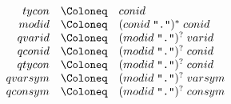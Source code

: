 \begin{align*}
  \begin{array}{rcl}
    {tycon}
    & \Coloneq & {conid}
    \\
    {modid}
    & \Coloneq & ({conid}\; \text{\texttt{\textquotedbl .\textquotedbl}})^*\; {conid}
    \\
    {qvarid}
    & \Coloneq & ({modid}\; \text{\texttt{\textquotedbl .\textquotedbl}})^?\; {varid}
    \\
    {qconid}
    & \Coloneq & ({modid}\; \text{\texttt{\textquotedbl .\textquotedbl}})^?\; {conid}
    \\
    {qtycon}
    & \Coloneq & ({modid}\; \text{\texttt{\textquotedbl .\textquotedbl}})^?\; {conid}
    \\
    {qvarsym}
    & \Coloneq & ({modid}\; \text{\texttt{\textquotedbl .\textquotedbl}})^?\; {varsym}
    \\
    {qconsym}
    & \Coloneq & ({modid}\; \text{\texttt{\textquotedbl .\textquotedbl}})^?\; {consym}
  \end{array}
\end{align*}

